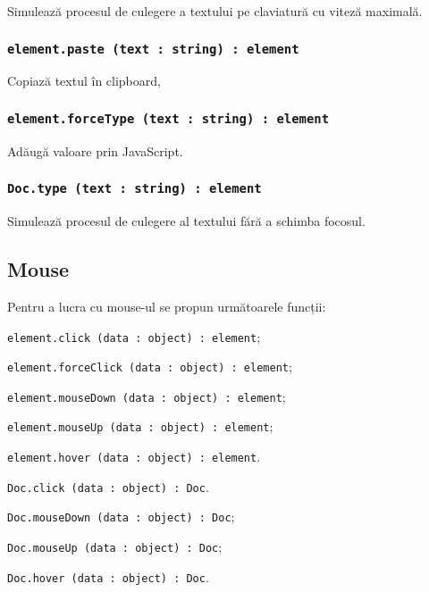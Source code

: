Simulează procesul de culegere a textului pe claviatură cu viteză maximală.

\subsubsection{\texttt{element.paste (text : string) : element}}

Copiază textul în clipboard, 

\subsubsection{\texttt{element.forceType (text : string) : element}}

Adăugă valoare prin JavaScript.

\subsubsection{\texttt{Doc.type (text : string) : element}}

Simulează procesul de culegere al textului fără a schimba focosul.

\subsection{Mouse}
\label{mouse}

Pentru a lucra cu mouse-ul se propun următoarele funcții:
\begin{icItems}
	\item \texttt{element.click (data : object) : element};
	\item \texttt{element.forceClick (data : object) : element};
	\item \texttt{element.mouseDown (data : object) : element};
	\item \texttt{element.mouseUp (data : object) : element};
	\item \texttt{element.hover (data : object) : element}.
	\item \texttt{Doc.click (data : object) : Doc}.
	\item \texttt{Doc.mouseDown (data : object) : Doc};
	\item \texttt{Doc.mouseUp (data : object) : Doc};
	\item \texttt{Doc.hover (data : object) : Doc}.
\end{icItems}

